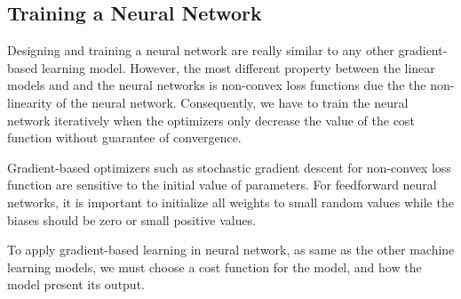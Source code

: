\subsection{Training a Neural Network}
\hspace{0.45cm}Designing and training a neural network are really similar to any other gradient-based learning model. 
However, the most different property between the linear models and and the neural networks is non-convex loss functions due the the non-linearity of the neural network. Consequently, we have to train the neural network iteratively when the optimizers only decrease the value of the cost function without guarantee of convergence.\par Gradient-based optimizers such as stochastic gradient descent for non-convex loss function are sensitive to the initial value of parameters\cite{Goodfellow-et-al-2016}. For feedforward neural networks, it is important to initialize all weights to small random values while the biases should be zero or small positive values.\par
To apply gradient-based learning in neural network, as same as the other machine learning models, we must choose a cost function for the model, and how the model present its output.
